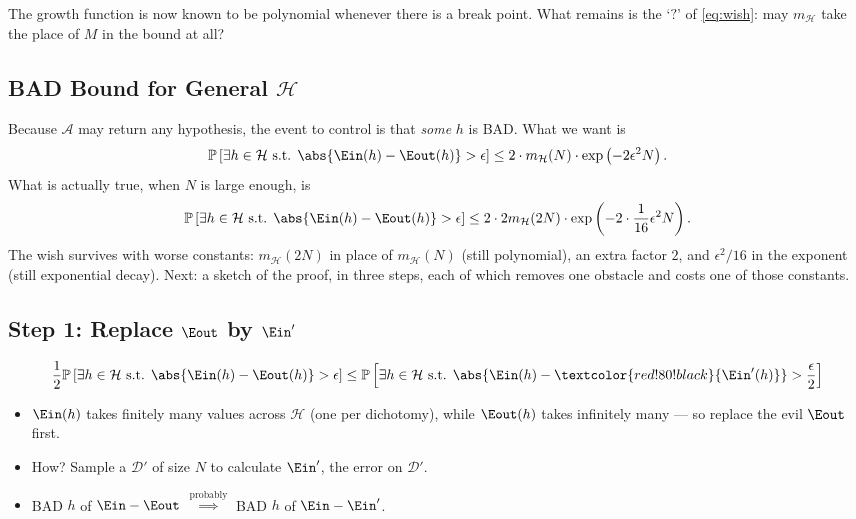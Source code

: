 
The growth function is now known to be polynomial whenever there is a break
point. What remains is the `\(?\)' of \autoref{eq:wish}: may
\(m_{\mathcal{H}}\) take the place of \(M\) in the bound at all?

\subsection{BAD Bound for General \texorpdfstring{\(\mathcal{H}\)}{H}}

Because \(\mathcal{A}\) may return any hypothesis, the event to control is that
\emph{some} \(h\) is BAD. What we want is
\[
    \mathbb{P}\left[ \exists h \in \mathcal{H} \text{ s.t. }
    \abs{\Ein(h) - \Eout(h)} > \epsilon \right]
    \le 2 \cdot m_{\mathcal{H}}(N) \cdot \exp \left( -2 \epsilon^2 N \right) .
\]
What is actually true, when \(N\) is large enough, is
\[
    \mathbb{P}\left[ \exists h \in \mathcal{H} \text{ s.t. }
    \abs{\Ein(h) - \Eout(h)} > \epsilon \right]
    \le 2 \cdot 2 m_{\mathcal{H}}(2N) \cdot
    \exp \left( -2 \cdot \frac{1}{16} \epsilon^2 N \right) .
\]
The wish survives with worse constants: \(m_{\mathcal{H}}(2N)\) in place of
\(m_{\mathcal{H}}(N)\) (still polynomial), an extra factor \(2\), and
\(\epsilon^2 / 16\) in the exponent (still exponential decay). Next: a sketch
of the proof, in three steps, each of which removes one obstacle and costs one
of those constants.

\subsection{Step 1: Replace \texorpdfstring{\(\Eout\)}{Eout} by
\texorpdfstring{\(\Ein'\)}{Ein'}}

\[
    \frac{1}{2} \mathbb{P}\left[ \exists h \in \mathcal{H} \text{ s.t. }
    \abs{\Ein(h) - \Eout(h)} > \epsilon \right]
    \le \mathbb{P}\left[ \exists h \in \mathcal{H} \text{ s.t. }
    \abs{\Ein(h) - \textcolor{red!80!black}{\Ein'(h)}} > \frac{\epsilon}{2}
    \right]
\]

\begin{itemize}
    \item \(\Ein(h)\) takes finitely many values across \(\mathcal{H}\) (one
        per dichotomy), while \(\Eout(h)\) takes infinitely many --- so replace
        the evil \(\Eout\) first.
    \item How? Sample a  \(\mathcal{D}'\) of size \(N\)
        to calculate \(\Ein'\), the error on \(\mathcal{D}'\).
    \item BAD \(h\) of \(\Ein - \Eout\) \(\overset{\text{probably}}{\implies}\)
        BAD \(h\) of \(\Ein - \Ein'\).
\end{itemize}

